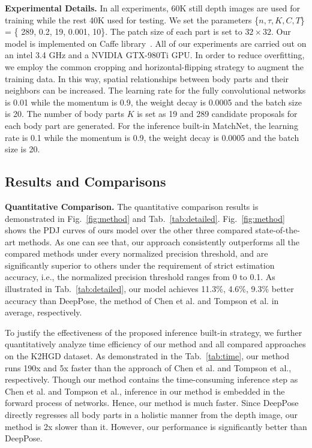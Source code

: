 \documentclass{sig-alternate-05-2015}
\begin{document}
\textbf{Experimental Details.} 
In all experiments, 60K still depth images are used for training while the rest 40K used for testing. We set the parameters \{$n, \tau, K, C, T$\} = \{ 289, 0.2, 19, 0.001, 10\}. The patch size of each part is set to $32 \times 32$. Our model is implemented on Caffe library~\cite{caffe14}. All of our experiments are carried out on an intel 3.4 GHz and a NVIDIA GTX-980Ti GPU. In order to reduce overfitting, we employ the common cropping and horizontal-flipping strategy to augment the training data.  In this way, spatial relationships between body parts and their neighbors can be increased. The learning rate for the fully convolutional networks is 0.01 while the momentum is 0.9, the weight decay is 0.0005 and the batch size is 20. The number of body parts $K$ is set as 19 and 289 candidate proposals for each body part are generated. For the inference built-in MatchNet, the learning rate is 0.1 while the momentum is 0.9, the weight decay is 0.0005 and the batch size is 20.  


\subsection{Results and Comparisons}
\textbf{Quantitative Comparison.} The quantitative comparison results is demonstrated in Fig.~\ref{fig:method} and Tab.~\ref{tab:detailed}. Fig.~\ref{fig:method} shows the PDJ curves of ours model over the other three compared state-of-the-art methods. As one can see that, our approach consistently outperforms all the compared methods under every normalized precision threshold, and are significantly superior to others under the requirement of strict estimation accuracy, i.e., the normalized precision threshold ranges from 0 to 0.1. As illustrated in Tab.~\ref{tab:detailed}, our model achieves 11.3\%, 4.6\%, 9.3\% better accuracy than DeepPose, the method of Chen et al. and Tompson et al. in average, respectively. 

To justify the effectiveness of the proposed inference built-in strategy, we further quantitatively analyze time efficiency of our method and all compared approaches on the K2HGD dataset. As demonstrated in the Tab.~\ref{tab:time}, our method runs 190x and 5x faster than the approach of Chen et al. and Tompson et al., respectively. Though our method contains the time-consuming inference step as Chen et al. and Tompson et al., inference in our method is embedded in the forward process of networks. Hence, our method is much faster. Since DeepPose directly regresses all body parts in a holistic manner from the depth image, our method is 2x slower than it. However, our performance is significantly better than DeepPose.
\end{document}

